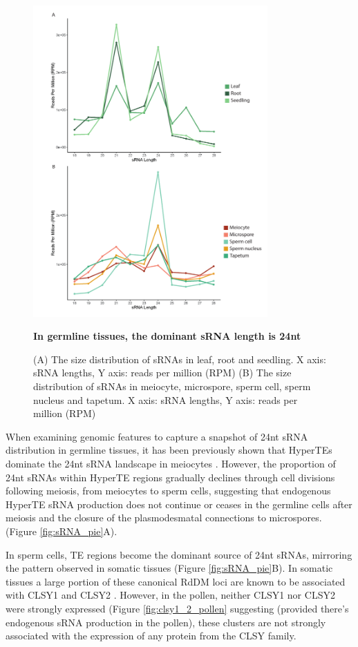 \begin{figure}[htbp!] 
\centering    
    \includegraphics[width=0.8\textwidth]{Chapter2/Figs/Figure6_sRNA_sizes.pdf}
\caption{\textbf{In germline tissues, the dominant sRNA length is 24nt}}
\label{fig:sRNA_sizes}
\captionsetup{font=small}
    \caption*{(A) The size distribution of sRNAs in leaf, root and seedling. X axis: sRNA lengths, Y axis: reads per million (RPM) (B) The size distribution of sRNAs in meiocyte, microspore, sperm cell, sperm nucleus and tapetum. X axis: sRNA lengths, Y axis: reads per million (RPM)}
\end{figure}

When examining genomic features to capture a snapshot of 24nt sRNA distribution in germline tissues, it has been previously shown that HyperTEs dominate the 24nt sRNA landscape in meiocytes \citep{RN187}. However, the proportion of 24nt sRNAs within HyperTE regions gradually declines through cell divisions following meiosis, from meiocytes to sperm cells, suggesting that endogenous HyperTE sRNA production does not continue or ceases in the germline cells after meiosis and the closure of the plasmodesmatal connections to microspores. (Figure \ref{fig:sRNA_pie}A). 

In sperm cells, TE regions become the dominant source of 24nt sRNAs, mirroring the pattern observed in somatic tissues (Figure \ref{fig:sRNA_pie}B). In somatic tissues a large portion of these canonical RdDM loci are known to be associated with CLSY1 and CLSY2 \citep{RN23}. However, in the pollen, neither CLSY1 nor CLSY2 were strongly expressed (Figure \ref{fig:clsy1_2_pollen} suggesting (provided there's endogenous sRNA production in the pollen), these clusters are not strongly associated with the expression of any protein from the CLSY family.

